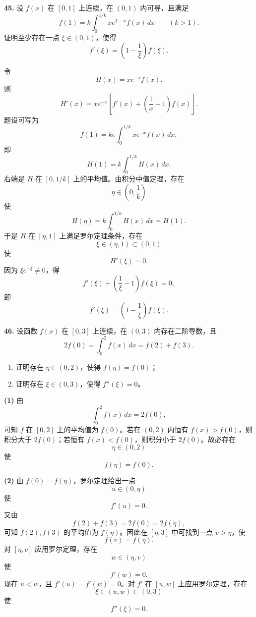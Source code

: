 \begin{problemblock}
\textbf{45.} 设 \(f(x)\) 在 \([0,1]\) 上连续，在 \((0,1)\) 内可导，且满足
\[
f(1)=k\int_0^{1/k}xe^{1-x}f(x)\,dx\qquad(k>1).
\]
证明至少存在一点 \(\xi\in(0,1)\)，使得
\[
f'(\xi)=\left(1-\frac1{\xi}\right)f(\xi).
\]
\end{problemblock}

\begin{solutionblock}
令
\[
H(x)=xe^{-x}f(x).
\]
则
\[
H'(x)=xe^{-x}\left[f'(x)+\left(\frac1x-1\right)f(x)\right].
\]
题设可写为
\[
f(1)=ke\int_0^{1/k}xe^{-x}f(x)\,dx,
\]
即
\[
H(1)=k\int_0^{1/k}H(x)\,dx.
\]
右端是 \(H\) 在 \([0,1/k]\) 上的平均值。由积分中值定理，存在
\[
\eta\in\left(0,\frac1k\right)
\]
使
\[
H(\eta)=k\int_0^{1/k}H(x)\,dx=H(1).
\]
于是 \(H\) 在 \([\eta,1]\) 上满足罗尔定理条件，存在
\[
\xi\in(\eta,1)\subset(0,1)
\]
使
\[
H'(\xi)=0.
\]
因为 \(\xi e^{-\xi}\ne0\)，得
\[
f'(\xi)+\left(\frac1\xi-1\right)f(\xi)=0,
\]
即
\[
f'(\xi)=\left(1-\frac1{\xi}\right)f(\xi).
\]
\end{solutionblock}

\begin{problemblock}
\textbf{46.} 设函数 \(f(x)\) 在 \([0,3]\) 上连续，在 \((0,3)\) 内存在二阶导数，且
\[
2f(0)=\int_0^2f(x)\,dx=f(2)+f(3).
\]
\begin{enumerate}
\item 证明存在 \(\eta\in(0,2)\)，使得 \(f(\eta)=f(0)\)；
\item 证明存在 \(\xi\in(0,3)\)，使得 \(f''(\xi)=0\)。
\end{enumerate}
\end{problemblock}

\begin{solutionblock}
\textbf{(1)} 由
\[
\int_0^2f(x)\,dx=2f(0),
\]
可知 \(f\) 在 \([0,2]\) 上的平均值为 \(f(0)\)。若在 \((0,2)\) 内恒有 \(f(x)>f(0)\)，则积分大于 \(2f(0)\)；若恒有 \(f(x)<f(0)\)，则积分小于 \(2f(0)\)。故必存在
\[
\eta\in(0,2)
\]
使
\[
f(\eta)=f(0).
\]

\textbf{(2)} 由 \(f(0)=f(\eta)\)，罗尔定理给出一点
\[
u\in(0,\eta)
\]
使
\[
f'(u)=0.
\]
又由
\[
f(2)+f(3)=2f(0)=2f(\eta),
\]
可知 \(f(2),f(3)\) 的平均值为 \(f(\eta)\)。因此在 \([\eta,3]\) 中可找到一点 \(v>\eta\)，使
\[
f(v)=f(\eta).
\]
对 \([\eta,v]\) 应用罗尔定理，存在
\[
w\in(\eta,v)
\]
使
\[
f'(w)=0.
\]
现在 \(u<w\)，且 \(f'(u)=f'(w)=0\)。对 \(f'\) 在 \([u,w]\) 上应用罗尔定理，存在
\[
\xi\in(u,w)\subset(0,3)
\]
使
\[
f''(\xi)=0.
\]
\end{solutionblock}

